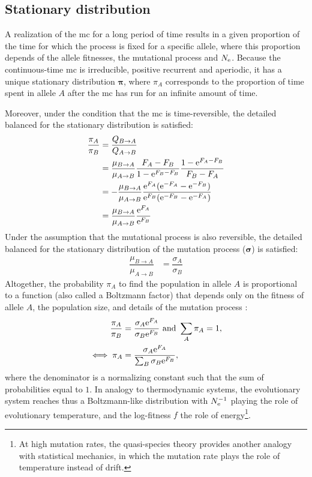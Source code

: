 \subsection{Stationary distribution}

A realization of the \gls{mc} for a long period of time results in a given proportion of the time for which the process is fixed for a specific \gls{allele}, where this proportion depends of the \gls{allele} fitnesses, the mutational process and $N_{\textrm{e}}$.
Because the continuous-time \gls{mc} is irreducible, positive recurrent and aperiodic, it has a unique stationary distribution $\bm{\pi}$, where $\pi_{A}$ corresponds to the proportion of time spent in \gls{allele} $A$ after the \gls{mc} has run for an infinite amount of time. 

Moreover, under the condition that the \gls{mc} is time-reversible, the detailed balanced for the stationary distribution is satisfied:
\begin{align}
\dfrac{\pi_{A}}{\pi_{B}} & = \dfrac{Q_{B \to A}}{Q_{A \to B}} \\
& = \dfrac{\mu_{B \to A}}{\mu_{A \to B}}  \dfrac{F_{A}-F_{B}}{ 1 - \mathrm{e}^{F_{B}-F_{B}}}  \dfrac{1 - \mathrm{e}^{F_{A} - F_{B}} }{F_{B} - F_{A}}\\
& = - \dfrac{\mu_{B \to A}}{\mu_{A \to B}}  \dfrac{ \mathrm{e}^{F_{A}}(\mathrm{e}^{-F_{A}} - \mathrm{e}^{- F_{B}}) }{ \mathrm{e}^{F_{B}}(\mathrm{e}^{-F_{B}} - \mathrm{e}^{- F_{A}})}  \\
& = \dfrac{\mu_{B \to A}}{\mu_{A \to B}} \dfrac{\mathrm{e}^{F_{A}}}{\mathrm{e}^{F_{B}}} \\
\end{align}
Under the assumption that the mutational process is also reversible, the detailed balanced for the stationary distribution of the mutation process ($\bm{\sigma}$) is satisfied:
\begin{align}
\dfrac{\mu_{B \to A}}{\mu_{A \to B}} & = \dfrac{\sigma_{A}}{\sigma_{B}} 
\end{align}
Altogether, the probability $\pi_{A}$ to find the population in \gls{allele} $A$ is proportional to a function (also called a Boltzmann factor) that depends only on the fitness of \gls{allele} $A$, the population size, and details of the mutation process \citep{Sella2005,Mustonen2005}:
\begin{align}
\dfrac{\pi_{A}}{\pi_{B}} & = \dfrac{\sigma_{A}\mathrm{e}^{F_{A}}}{\sigma_{B}\mathrm{e}^{F_{B}}} \text{ and } \sum_{A}\pi_{A} = 1, \\ 
\iff \pi_{A} & = \dfrac{\sigma_{A}\mathrm{e}^{F_{A}}}{\sum_{B} \sigma_{B}\mathrm{e}^{F_{B}} }, \label{eq:equilibrium-mut-sel}
\end{align}
where the denominator is a normalizing constant such that the sum of probabilities equal to $1$.
In analogy to thermodynamic systems, the evolutionary system reaches thus a Boltzmann-like distribution with $N_{\textrm{e}}^{-1}$ playing the role of evolutionary temperature, and the log-fitness $f$ the role of energy\footnote{At high mutation rates, the quasi-species theory provides another analogy with statistical mechanics, in which the mutation rate plays the role of temperature instead of \gls{drift}.}.

